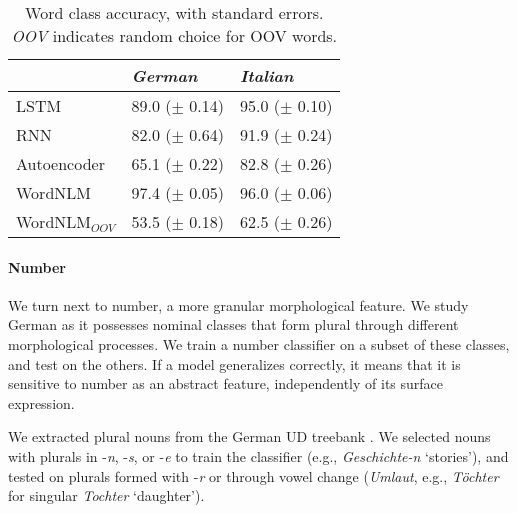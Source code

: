 \begin{table}[t]
\footnotesize
    \begin{center}
      \begin{tabular}{l|l|l}
        &\emph{German}&\emph{Italian}\\
        \hline
        LSTM & 89.0 ($\pm$ 0.14) & 95.0 ($\pm$ 0.10) \\
        RNN & 82.0 ($\pm$ 0.64) & 91.9 ($\pm$ 0.24) \\
        Autoencoder & 65.1 ($\pm$ 0.22) & 82.8 ($\pm$ 0.26) \\
        WordNLM & 97.4 ($\pm$ 0.05) & 96.0 ($\pm$ 0.06) \\
	      WordNLM$_{OOV}$ & 53.5 ($\pm$ 0.18)  & 62.5 ($\pm$ 0.26) \\
      \end{tabular}
    \end{center}
	\caption{\label{tab:pos-results} Word class accuracy, with standard errors. \emph{OOV} indicates random choice for OOV words.} %
\end{table}







\paragraph{Number}
We turn next to number, a more granular morphological feature. We
study German as it possesses nominal classes that form plural
through different morphological processes. We train a number
classifier on a subset of these classes, and test on the others. If a
model generalizes correctly, it means that it is sensitive to number
as an abstract feature, independently of its surface expression.

We extracted plural nouns from the German UD
treebank \cite{de2006generating,mcdonald2013universal}.  We selected
nouns with plurals in -\emph{n}, -\emph{s}, or -\emph{e} to train the classifier (e.g., \emph{Geschichte-n} `stories'), and tested on plurals formed with
-\emph{r} or through vowel change (\emph{Umlaut}, e.g., \emph{T{\"o}chter} for singular \emph{Tochter} `daughter').

